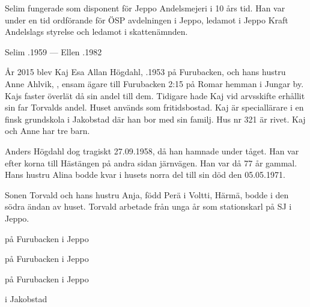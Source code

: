 Selim fungerade som disponent för Jeppo Andelsmejeri i 10 års tid. Han var under en tid ordförande för ÖSP avdelningen i Jeppo, ledamot i Jeppo Kraft Andelslags styrelse och ledamot i skattenämnden.
\begin{jhchildren}
  \item {}
  \item {}
\end{jhchildren}

Selim .1959  ---  Ellen .1982


%


%
År 2015 blev Kaj Esa Allan Högdahl, .1953 på Furubacken, och hans hustru Anne Ahlvik, , ensam ägare till Furubacken	2:15 på Romar hemman i Jungar by. Kajs faster  överlät då sin andel till dem. Tidigare hade Kaj vid arvsskifte erhållit sin far Torvalds andel. Huset används som fritidsbostad. Kaj är speciallärare i en finsk grundskola i Jakobstad där han bor med sin familj. Hus nr 321 är rivet. Kaj och Anne har tre barn.
\begin{jhchildren}
  \item {}
  \item {}
  \item {}
\end{jhchildren}

%

Anders Högdahl dog tragiskt 27.09.1958, då han hamnade under tåget.	Han var efter korna till Hästängen på andra sidan järnvägen. Han var då 77 år gammal. Hans hustru Alina bodde kvar i husets norra del till sin död den 05.05.1971.

Sonen Torvald och hans hustru Anja, född Perä  i Voltti, Härmä, bodde i den södra ändan av huset. Torvald arbetade från unga år som	stationskarl på SJ i Jeppo.
\begin{jhchildren}
  \item {} på Furubacken i Jeppo
  \item {} på Furubacken i Jeppo
  \item {} på Furubacken i Jeppo
  \item {} i Jakobstad
\end{jhchildren}

